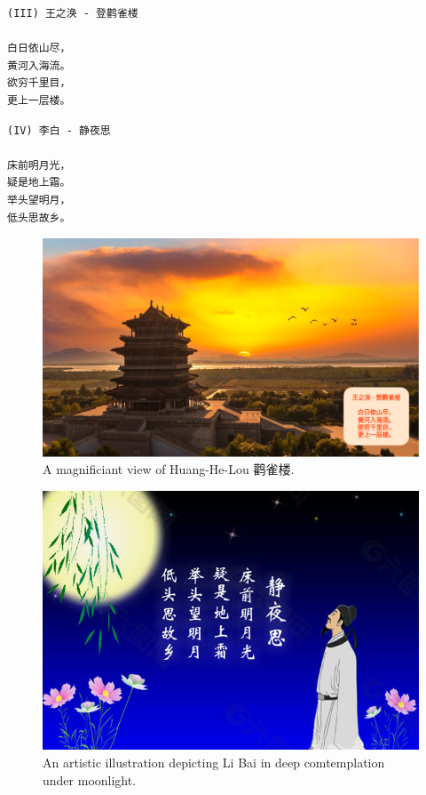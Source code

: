 \begin{verbatim}
(III) 王之涣 - 登鹳雀楼

白日依山尽，
黄河入海流。
欲穷千里目，
更上一层楼。
\end{verbatim}

\begin{verbatim}
(IV) 李白 - 静夜思

床前明月光，
疑是地上霜。
举头望明月，
低头思故乡。
\end{verbatim}

\begin{figure}
\centering
\includegraphics{./images/poem_huang-he-lou.png}
\caption{A magnificiant view of Huang-He-Lou 鹳雀楼.}
\end{figure}

\begin{figure}
\centering
\includegraphics{./images/poem_moonlight.jpg}
\caption{An artistic illustration depicting Li Bai in deep comtemplation
under moonlight.}
\end{figure}

